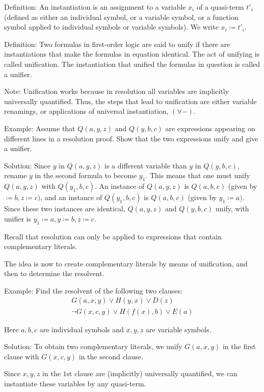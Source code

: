 \documentclass{article}
\begin{document}
Definition: An instantiation is an assignment to a variable $x_i$ of a quasi-term $t'_i$ (defined as either an individual symbol, or a variable symbol, or a function symbol applied to individual symbols or variable symbols). We write $x_i \coloneqq t'_i$.

Definition: Two formulas in first-order logic are said to unify if there are instantiations that make the formulas in equation identical. The act of unifying is called unification. The instantiation that unified the formulas in question is called a unifier.

Note: Unification works because in resolution all variables are implicitly universally quantified. Thus, the steps that lead to unification are either variable renamings, or applications of universal instantiation, $(\forall -)$.

Example: Assume that $Q(a,y,z)$ and $Q(y,b,c)$ are expressions appearing on different lines in a resolution proof. Show that the two expressions unify and give a unifier.

Solution: Since $y$ in $Q(a,y,z)$ is a different variable than $y$ in $Q(y,b,c)$, rename $y$ in the second formula to become $y_1$. This means that one must unify $Q(a,y,z)$ with $Q(y_1,b,c)$. An instance of $Q(a,y,z)$ is $Q(a,b,c)$ (given by $\coloneqq b, z \coloneqq c)$, and an instance of $Q(y_1, b, c)$ is $Q(a,b,c)$ (given by $y_1 \coloneqq a)$. Since these two instances are identical, $Q(a,y,z)$ and $Q(y,b,c)$ unify, with unifier is $y_1 \coloneqq a, y \coloneqq b, z \coloneqq c$. 

Recall that resolution can only be applied to expressions that contain complementary literals.

The idea is now to create complementary literals by means of unification, and then to determine the resolvent.

Example: Find the resolvent of the following two clauses:
\begin{align*}
G(a,x,y) \vee H(y,x) \vee D(z) \\
\neg G(x,c,y) \vee H(f(x),b) \vee E(a)
\end{align*}

Here $a,b,c$ are individual symbols and $x,y,z$ are variable symbols.

Solution: To obtain two complementary literals, we unify $G(a,x,y)$ in the first clause with $G(x,c,y)$ in the second clause.

Since $x,y,z$ in the $1$st clause are (implicitly) universally quantified, we can instantiate these variables by any quasi-term.
\end{document}
